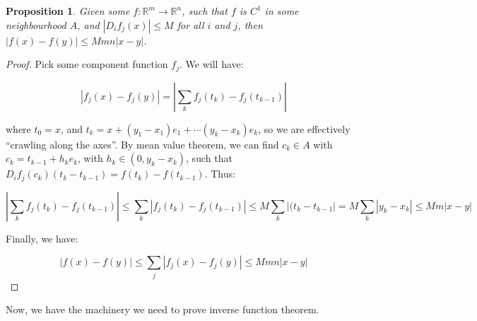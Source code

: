 \documentclass[10pt, oneside]{amsart}
\newtheorem{prop}{Proposition}
\begin{document}
      \begin{prop}
        Given some $f : \mathbb{R}^{m} \rightarrow \mathbb{R}^{n}$, such that $f$ is $C^{1}$ in some neighbourhood $A$, and $|D_i f_j(x)| \leq M$ for all $i$ and $j$, then $|f(x) - f(y)| \leq M mn |x - y|$.
      \end{prop}

      \begin{proof}
        Pick some component function $f_j$. We will have:

        $$|f_j(x) - f_j(y)| = \left| \displaystyle\sum_{k} f_j(t_k) - f_j(t_{k - 1}) \right|$$

        where $t_0 = x$, and $t_k = x + (y_1 - x_1) e_1 + \cdots (y_k - x_k) e_k$, so we are effectively ``crawling along the axes''. By mean value theorem, we can find $c_k \in A$
        with $c_k = t_{k - 1} + h_k e_k$, with $h_k \in (0, y_k - x_k)$, such that $D_i f_j(c_k) (t_k - t_{k - 1}) = f(t_k) - f(t_{k - 1})$. Thus:

        $$\left| \displaystyle\sum_{k} f_j(t_k) - f_j(t_{k - 1}) \right| \leq \displaystyle\sum_{k} \left| f_j(t_k) - f_j(t_{k - 1}) \right| \leq M \displaystyle\sum_{k} \left| (t_k - t_{k - 1} \right| = M \displaystyle\sum_{k} |y_k - x_k| \leq M m |x - y|$$

        Finally, we have:

        $$|f(x) - f(y)| \leq \displaystyle\sum_{j} |f_j(x) - f_j(y)| \leq M m n |x - y|$$
      \end{proof}

      Now, we have the machinery we need to prove inverse function theorem. 

    
\end{document}
